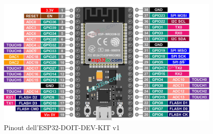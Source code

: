 \documentclass[12pt,a4paper]{report}
\begin{document}
\begin{figure}[H]
    \centering
    \includegraphics[width=\linewidth]{../image/ESP-38Pin-pinout.jpg}
    \caption{Pinout dell'ESP32-DOIT-DEV-KIT v1}
\end{figure}
\end{document}
